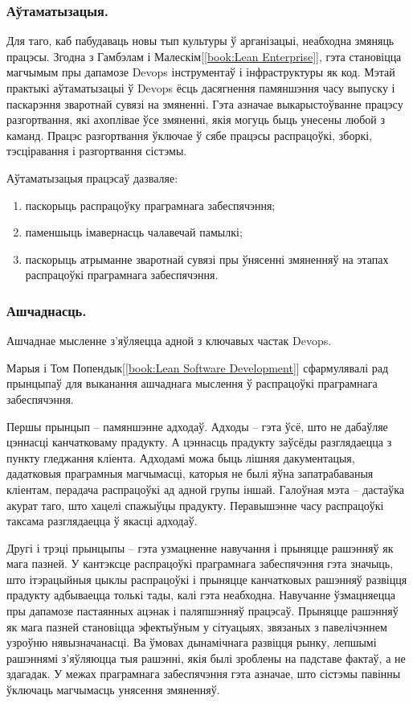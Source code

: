 \subsubsection{Аўтаматызацыя.}

Для таго, каб пабудаваць новы тып культуры ў арганізацыі,
неабходна змяняць працэсы.
Згодна з Гамбэлам і Малескім[\ref{book:Lean Enterprise}],
гэта становіцца магчымым пры дапамозе Devops інструментаў і 
інфраструктуры як код. Мэтай практыкі аўтаматызацыі ў Devops
ёсць дасягнення памяншэння часу выпуску і паскарэння зваротнай
сувязі на змяненні.
Гэта азначае выкарыстоўванне працэсу разгортвання,
які ахоплівае ўсе змяненні, якія могуць быць унесены любой з каманд.
Працэс разгортвання ўключае ў сябе працэсы распрацоўкі, зборкі,
тэсціравання і разгортвання сістэмы.

Аўтаматызацыя працэсаў дазваляе:
\begin{enumerate}
    \item паскорыць распрацоўку праграмнага забеспячэння;
    \item паменшыць імавернасць чалавечай памылкі;
    \item паскорыць атрыманне зваротнай сувязі пры ўнясенні змяненняў
          на этапах распрацоўкі праграмнага забеспячэння.
\end{enumerate}

\subsubsection{Ашчаднасць.}
Ашчаднае мысленне з'яўляецца адной з ключавых частак Devops.

Марыя і Том Попендык[\ref{book:Lean Software Development}]
сфармулявалі рад прынцыпаў для выканання ашчаднага мыс\-лен\-ня ў
распрацоўкі праграмнага забеспячэння.

Першы прынцып -- памяншэнне адходаў.
Адходы -- гэта ўсё, што не дабаўляе цэннасці канчатковаму прадукту.
А цэннасць прадукту заўсёды разглядаецца з пункту гледжання кліента.
Адходамі можа быць лішняя дакументацыя, дадатковыя праграмныя магчымасці,
каторыя не былі яўна запатрабаваныя кліентам,
перадача распрацоўкі ад адной групы іншай.
Галоўная мэта -- дастаўка акурат таго, што хацелі спажыўцы прадукту.
Перавышэнне часу распрацоўкі таксама разглядаецца ў якасці адходаў.

Другі і трэці прынцыпы -- гэта узмацненне навучання і прыняцце рашэнняў як
мага пазней. У кантэксце распрацоўкі праграмнага забеспячэння гэта
значыць, што ітэрацыйныя цыклы распрацоўкі і прыняцце канчатковых
рашэнняў развіцця прадукту адбываецца толькі тады, калі гэта неабходна.
Навучанне ўзмацняецца пры дапамозе пастаянных ацэнак і паляпшэнняў працэсаў.
Прыняцце рашэнняў як мага пазней становіцца эфектыўным у сітуацыях,
звязаных з павелічэннем узроўню нявызначанасці.
Ва ўмовах дынамічнага развіцця рынку, лепшымі рашэннямі з'яўляюцца тыя
рашэнні, якія былі зроблены на падставе фактаў, а не здагадак.
У межах праграмнага забеспячэння гэта азначае, што сістэмы павінны
ўключаць магчымасць унясення змяненняў.


